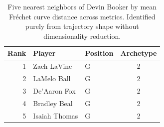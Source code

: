 \begin{table}[htbp]
  \centering\small
  \begin{tabular}{rllc}
    \toprule
    Rank & Player & Position & Archetype \\
    \midrule
    1 & Zach LaVine & G & 2 \\
    2 & LaMelo Ball & G & 2 \\
    3 & De'Aaron Fox & G & 2 \\
    4 & Bradley Beal & G & 2 \\
    5 & Isaiah Thomas & G & 2 \\
    \bottomrule
  \end{tabular}
  \caption{Five nearest neighbors of Devin Booker by mean Fr\'{e}chet curve distance across metrics. Identified purely from trajectory shape without dimensionality reduction.}
  \label{tab:Devin_Booker_frechet_curve_neighbors}
\end{table}


